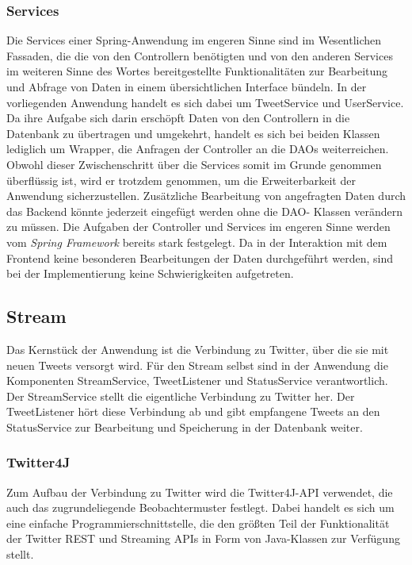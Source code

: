 \subsubsection*{Services}
Die Services einer Spring-Anwendung im engeren Sinne sind im Wesentlichen Fassaden, die die von den 
Controllern benötigten und von den anderen Services im weiteren Sinne des Wortes bereitgestellte 
Funktionalitäten zur Bearbeitung und Abfrage von Daten in einem übersichtlichen Interface bündeln. 
In der vorliegenden Anwendung handelt es sich dabei um TweetService und UserService. Da ihre Aufgabe 
sich darin erschöpft Daten von den Controllern in die Datenbank zu übertragen und umgekehrt, handelt 
es sich bei beiden Klassen lediglich um Wrapper, die Anfragen der Controller an die DAOs 
weiterreichen. Obwohl dieser Zwischenschritt über die Services somit im Grunde genommen überflüssig 
ist, wird er trotzdem genommen, um die Erweiterbarkeit der Anwendung sicherzustellen. Zusätzliche 
Bearbeitung von angefragten Daten durch das Backend könnte jederzeit eingefügt werden ohne die DAO-
Klassen verändern zu müssen.
\newpage
Die Aufgaben der Controller und Services im engeren Sinne werden vom \textit{Spring Framework} 
bereits stark festgelegt. Da in der Interaktion mit dem Frontend keine besonderen Bearbeitungen der 
Daten durchgeführt werden, sind bei der Implementierung keine Schwierigkeiten aufgetreten.

\subsection{Stream}
Das Kernstück der Anwendung ist die Verbindung zu Twitter, über die sie mit neuen Tweets versorgt wird. 
Für den Stream selbst sind in der Anwendung die Komponenten StreamService, TweetListener und 
StatusService verantwortlich. Der StreamService stellt die eigentliche Verbindung zu Twitter her. Der 
TweetListener hört diese Verbindung ab und gibt empfangene Tweets an den StatusService zur Bearbeitung 
und Speicherung in der Datenbank weiter.

\subsubsection*{Twitter4J}
Zum Aufbau der Verbindung zu Twitter wird die Twitter4J-API verwendet, die auch das zugrundeliegende 
Beobachtermuster festlegt. Dabei handelt es sich um eine einfache Programmierschnittstelle, die den 
größten Teil der Funktionalität der Twitter REST und Streaming APIs in Form von Java-Klassen zur 
Verfügung stellt.

